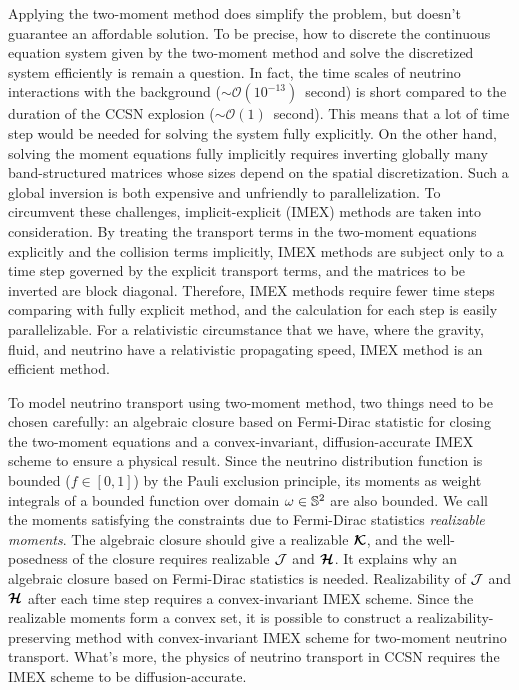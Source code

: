 Applying the two-moment method does simplify the problem, but doesn't guarantee an affordable solution.
To be precise, how to discrete the continuous equation system given by the two-moment method and solve the discretized system efficiently is remain a question.
In fact, the time scales of neutrino interactions with the background ($\sim\mathcal{O}(10^{-13})$~second) is short compared to the duration of the CCSN explosion ($\sim\mathcal{O}(1)$~second).  
This means that a lot of time step would be needed for solving the system fully explicitly. 
On the other hand, solving the moment equations fully implicitly requires inverting globally many band-structured matrices whose sizes depend on the spatial discretization.
Such a global inversion is both expensive and unfriendly to parallelization.
To circumvent these challenges, implicit-explicit (IMEX) methods are taken into consideration.
By treating the transport terms in the two-moment equations explicitly and the collision terms implicitly, IMEX methods are subject only to a time step governed by the explicit transport terms, and the matrices to be inverted are block diagonal.
Therefore, IMEX methods require fewer time steps comparing with fully explicit method, and the calculation for each step is easily parallelizable.  
For a relativistic circumstance that we have, where the gravity, fluid, and neutrino have a relativistic propagating speed, IMEX method is an efficient method.

To model neutrino transport using two-moment method, two things need to be chosen carefully: an algebraic closure based on Fermi-Dirac statistic for closing the two-moment equations and a convex-invariant, diffusion-accurate IMEX scheme to ensure a physical result.
Since the neutrino distribution function is bounded ($f\in[0,1]$) by the Pauli exclusion principle, its moments as weight integrals of a bounded function over domain $\omega\in\mathbb{S}^{2}$ are also bounded.
We call the moments satisfying the constraints due to Fermi-Dirac statistics \textit{realizable moments}.
The algebraic closure should give a realizable $\boldsymbol{\mathcal{K}}$, and the well-posedness of the closure requires realizable $\mathcal{J}$ and $\boldsymbol{\mathcal{H}}$.
It explains why an algebraic closure based on Fermi-Dirac statistics is needed.
Realizability of $\mathcal{J}$ and $\boldsymbol{\mathcal{H}}$ after each time step requires a convex-invariant IMEX scheme.
Since the realizable moments form a convex set, it is possible to construct a realizability-preserving method with convex-invariant IMEX scheme for two-moment neutrino transport.
What's more, the physics of neutrino transport in CCSN requires the IMEX scheme to be diffusion-accurate.

